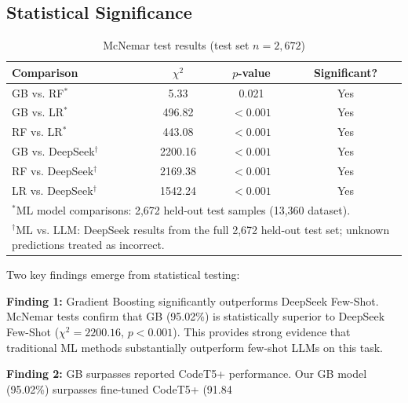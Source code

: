 \documentclass[10pt,letterpaper]{article}
\begin{document}
\subsection{Statistical Significance}

\begin{table}[htbp]
\centering
\caption{McNemar test results (test set $n=2{,}672$)}
\label{tab:mcnemar}
\begin{tabular}{@{}lccc@{}}
\toprule
Comparison & $\chi^2$ & $p$-value & Significant? \\
\midrule
GB vs. RF$^{*}$    & 5.33  & 0.021 & Yes \\
GB vs. LR$^{*}$    & 496.82& $<0.001$ & Yes \\
RF vs. LR$^{*}$    & 443.08& $<0.001$ & Yes \\
GB vs. DeepSeek$^{\dagger}$ & 2200.16 & $<0.001$ & Yes \\
RF vs. DeepSeek$^{\dagger}$ & 2169.38 & $<0.001$ & Yes \\
LR vs. DeepSeek$^{\dagger}$ & 1542.24 & $<0.001$ & Yes \\
\multicolumn{4}{l}{\small $^{*}$ML model comparisons: 2,672 held-out test samples (13,360 dataset).} \\
\multicolumn{4}{l}{\small $^{\dagger}$ML vs. LLM: DeepSeek results from the full 2,672 held-out test set; unknown predictions treated as incorrect.} \\
\bottomrule
\end{tabular}
\end{table}

Two key findings emerge from statistical testing:

\begin{flushleft}
\textbf{Finding 1:} Gradient Boosting significantly outperforms DeepSeek Few-Shot. McNemar tests confirm that GB (95.02\%) is statistically superior to DeepSeek Few-Shot ($\chi^2 = 2200.16$, $p < 0.001$). This provides strong evidence that traditional ML methods substantially outperform few-shot LLMs on this task.

\textbf{Finding 2:} GB surpasses reported CodeT5+ performance. Our GB model (95.02\%) surpasses fine-tuned CodeT5+ (91.84\\%
\end{flushleft}

\end{document}
